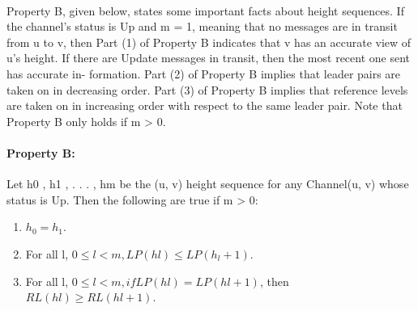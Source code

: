 \paragraph{}Property B, given below, states some important facts about height sequences. If the channel's status is Up and m = 1, meaning that no messages are in transit from u to v, then Part (1) of Property B indicates that v has an accurate view of u's height. If there are Update messages in transit, then the most recent one sent has accurate in- formation. Part (2) of Property B implies that leader pairs are taken on in decreasing order. Part (3) of Property B implies that reference levels are taken on in increasing order with respect to the same leader pair. Note that Property B only holds if m > 0.
\paragraph{Property B:}Let h0 , h1 , . . . , hm be the (u, v) height sequence for any Channel(u, v) whose status is Up. Then the following are true if m > 0:
\begin{enumerate}
	\item $h_0 = h_1$.
	\item For all l, $0 \leq l < m, LP(hl ) \leq LP(h_l+1 )$.
	\item For all l, $0 \leq l < m, if LP(hl ) = LP(hl+1 )$, then $RL(hl ) \geq RL(hl+1 )$.
\end{enumerate}
